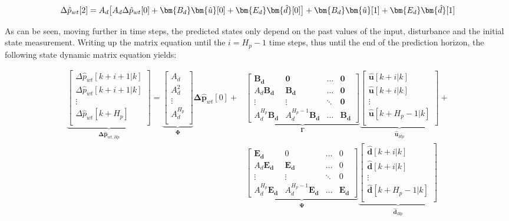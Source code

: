 \begin{equation}
	\Delta \hat p_{wt}[2] = A_d\big[A_d\Delta \hat p_{wt}[0] + \bm{B_d}  \bm{\hat{u}}[0] + \bm{E_d}  \bm{\hat{d}}[0]\big] + \bm{B_d} \bm{\hat{u}}[1] + \bm{E_d} \bm{\hat{d}}[1]\\ 
\end{equation}

As can be seen, moving further in time steps, the predicted states only depend on the past values of the input, disturbance and the initial state measurement. Writing up the matrix equation until the $i = H_p - 1$ time steps, thus until the end of the prediction horizon, the following state dynamic matrix equation yields:

\begin{align}
\underbrace{\begin{bmatrix}
\Delta \hat p_{wt}[k+i+1|k] \\ 
\Delta \hat p_{wt}[k+i+1|k]\\ 
\vdots \\ 
\Delta \hat p_{wt}[k+H_p]\\ 
\end{bmatrix}}_{\bm{\Delta \hat{p}}_{wt,Hp}}
=
\underbrace{\begin{bmatrix}
A_d \\ 
A_d^2\\ 
\vdots \\ 
A_d^{H_p}\\ 
\end{bmatrix}}_{\bm{\Phi}}
\bm{\Delta \hat{p}}_{wt}[0]+\nonumber
&
\underbrace{\begin{bmatrix}
 \bm{B_d}& \bm{0} & \hdots  & \bm{0}\\ 
 A_d\bm{B_d}&  \bm{B_d}& \hdots & \bm{0}\\ 
\vdots &\vdots  & \ddots  & \bm{0}\\ 
 A_d^{H_p}\bm{B_d}& A_d^{H_p-1}\bm{B_d}  & \hdots  & \bm{B_d}
\end{bmatrix}}_{\bm{\Gamma}}
\underbrace{\begin{bmatrix}
 \bm{\hat{u}}[k+i|k] \\ 
 \bm{\hat{u}}[k+i|k]\\ 
\vdots \\ 
 \bm{\hat{u}}[k+H_p-1|k]\\ 
\end{bmatrix}}_{\bm{\hat{u}}_{Hp}}
+ \\
&
\underbrace{\begin{bmatrix}
 \bm{E_d}& 0 & \hdots  & 0\\ 
 A_d\bm{E_d}&  \bm{E_d}& \hdots & 0\\ 
\vdots &\vdots  & \ddots  & 0\\ 
 A_d^{H_p}\bm{E_d}& A_d^{H_p-1}\bm{E_d}  & \hdots  & \bm{E_d}
\end{bmatrix}}_{\bm{\Psi}}
\underbrace{\begin{bmatrix}
 \bm{\hat{d}}[k+i|k] \\ 
 \bm{\hat{d}}[k+i|k]\\ 
\vdots \\ 
 \bm{\hat{d}}[k+H_p-1|k]\\ 
\end{bmatrix}}_{\bm{\hat{d}}_{Hp}} 
\end{align}

